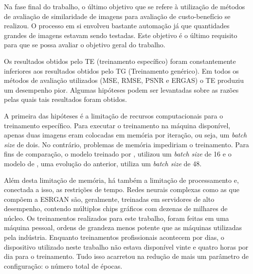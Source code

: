 Na fase final do trabalho, o último objetivo que se refere à utilização de métodos de avaliação de similaridade de imagens para avaliação de custo-benefício se realizou. O processo em si envolveu bastante automação já que quantidades grandes de imagens estavam sendo testadas. Este objetivo é o último requisito para que se possa avaliar o objetivo geral do trabalho.  

Os resultados obtidos pelo TE (treinamento específico) foram constantemente inferiores aos resultados obtidos pelo TG (Treinamento genérico). Em todos os métodos de avaliação utilizados (MSE, RMSE, PSNR e ERGAS) o TE produziu um desempenho pior. Algumas hipóteses podem ser levantadas sobre as razões pelas quais tais resultados foram obtidos.

A primeira das hipóteses é a limitação de recursos computacionais para o treinamento específico. Para executar o treinamento na máquina disponível, apenas duas imagens eram colocadas em memória por iteração, ou seja, um \textit{batch size} de dois. No contrário, problemas de memória impediriam o treinamento. Para fins de comparação, o modelo treinado por , utilizou um \textit{batch size} de 16 e o modelo de , uma evolução do anterior, utiliza um \textit{batch size} de 48. 

Além desta limitação de memória, há também a limitação de processamento e, conectada a isso, as restrições de tempo. Redes neurais complexas como as que compõem a ESRGAN são, geralmente, treinadas em servidores de alto desempenho, contendo múltiplos chips gráficos com dezenas de milhares de núcleo. Os treinamentos realizados para este trabalho, foram feitas em uma máquina pessoal, ordens de grandeza menos potente que as máquinas utilizadas pela indústria. Enquanto treinamentos profissionais acontecem por dias, o dispositivo utilizado neste trabalho não estava disponível vinte e quatro horas por dia para o treinamento. Tudo isso acarretou na redução de mais um parâmetro de configuração: o número total de épocas.

